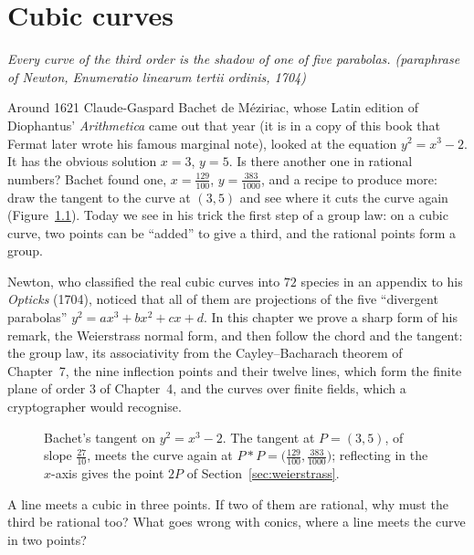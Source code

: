\chapter{Cubic curves}\label{ch:cubics}

\begin{center}\itshape
Every curve of the third order is the shadow of one of five parabolas.
\upshape(paraphrase of Newton, \emph{Enumeratio linearum tertii ordinis}, 1704)
\end{center}

Around 1621 Claude-Gaspard Bachet de M\'eziriac, whose Latin edition of Diophantus' \emph{Arithmetica} came out that year (it is in a copy of this
book that Fermat later wrote his famous marginal note), looked at the equation $y^2=x^3-2$. It has the obvious solution $x=3$, $y=5$. Is there another
one in rational numbers? Bachet found one, $x=\frac{129}{100}$, $y=\frac{383}{1000}$, and a recipe to produce more: draw the tangent to the curve at
$(3,5)$ and see where it cuts the curve again (Figure~\ref{fig:bachet}). Today we see in his trick the first step of a group law: on a cubic curve, two
points can be ``added'' to give a third, and the rational points form a group.

Newton, who classified the real cubic curves into $72$ species in an appendix to his \emph{Opticks} (1704), noticed that all of them are projections of
the five ``divergent parabolas'' $y^2=ax^3+bx^2+cx+d$. In this chapter we prove a sharp form of his remark, the Weierstrass normal form, and then follow
the chord and the tangent: the group law, its associativity from the Cayley--Bacharach theorem of Chapter~7, the nine inflection points and their twelve
lines, which form the finite plane of order $3$ of Chapter~4, and the curves over finite fields, which a cryptographer would recognise.

\begin{figure}[ht]
\centering
{}
\caption{Bachet's tangent on $y^2=x^3-2$. The tangent at $P=(3,5)$, of slope $\frac{27}{10}$, meets the curve again at
$P*P=\bigl(\frac{129}{100},\frac{383}{1000}\bigr)$; reflecting in the $x$-axis gives the point $2P$ of Section~\ref{sec:weierstrass}.}
\label{fig:bachet}
\end{figure}

\begin{think}
A line meets a cubic in three points. If two of them are rational, why must the third be rational too? What goes wrong with conics, where a line meets
the curve in two points?
\end{think}


